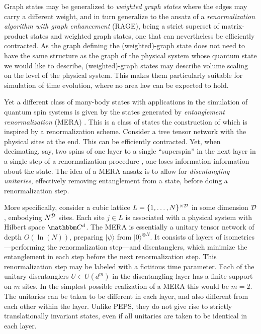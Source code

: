 \documentclass[12pt, rmp,floatfix,epsfig,graphics]{revtex4} %
\begin{document}
Graph states may be generalized to {\it weighted graph states} 
\cite{Weighted,GraphsLong,PlenioJMO} where the edges may carry a 
different weight, and in turn generalize to the ansatz of a
{\it renormalization algorithm with graph enhancement} (RAGE),\cite{Rage} 
being a strict superset of matrix-product states 
and weighted graph states, one that can nevertheless be efficiently 
contracted. As the graph defining the (weighted)-graph state does
not need to have the same structure as the graph of the physical
system whose quantum state we would like to describe, (weighted)-graph 
states may describe volume scaling on the level of the physical
system. This makes them particularly suitable for simulation of time 
evolution, where no area law can be expected to hold. 

Yet a different class of many-body states with applications in the simulation of 
quantum spin systems is given by the states  generated by {\it entanglement 
renormalization} (MERA) \cite{MERA1}. 
This is a class of states the construction of which is
inspired by a renormalization scheme. Consider a 
tree tensor network with
the physical sites at the end. This can be efficiently contracted. Yet, when decimating, say,
two spins of one layer to a single ``superspin'' in the next layer in a single step of a 
renormalization procedure , one loses information information about the state. The idea
of a MERA ansatz is to allow for {\it disentangling unitaries}, effectively removing
entanglement from a state, before doing a renormalization step.  

More specifically, consider a cubic lattice $L=\{1,\dots, N\}^{\times {\cal D}}$
in some dimension ${\cal D}$, embodying $N^{\cal D}$ sites. Each 
site $j\in L$ is associated with a physical system with Hilbert 
space $\cc^d$. The MERA is essentially a unitary tensor network of depth
$O(\ln(N))$, preparing $|\psi\rangle$ from $|0\rangle^{\otimes N}$. 
It consists of layers of isometries ---performing the renormalization 
step---and disentanglers, which minimize the entanglement in each 
step before the next renormalization step. This renormalization 
step may be labeled with a fictitous time parameter. Each of the 
unitary disentanglers  $U\in U(d^m)$ in the disentangling layer
has a finite support on $m$ sites. In the simplest possible 
realization of a MERA this would be $m=2$. The unitaries can be 
taken to be different in each layer, and also different from each 
other within the layer. Unlike PEPS, they do not give rise to 
strictly translationally invariant states, even if all unitaries 
are taken to be identical in each layer. 
 
\end{document}
